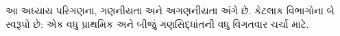\documentclass[../../../include/open-logic-chapter]{subfiles}
\begin{document}

\begin{editorial}
આ અધ્યાય પરિગણના, ગણનીયતા અને અગણનીયતા અંગે છે.
કેટલાક વિભાગોના બે સ્વરૂપો છે:
એક વધુ પ્રાથમિક અને બીજું ગણસિદ્ધાંતની વધુ વિગતવાર ચર્ચા માટે.
\end{editorial}











\OLEndChapterHook
\end{document}
